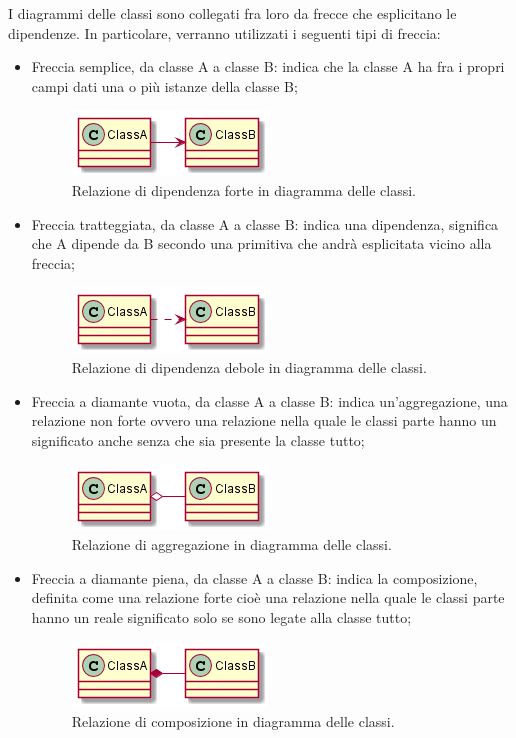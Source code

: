 \documentclass[NormeDiProgetto.tex]{subfiles}
\begin{document}
I diagrammi delle classi sono collegati fra loro da frecce che esplicitano le dipendenze.
In particolare, verranno utilizzati i seguenti tipi di freccia:
\begin{itemize}
	\item Freccia semplice, da classe A a classe B: indica che la classe A ha fra i propri campi dati una o più istanze della classe B;
	\begin{figure}[h]
		\centering
		\includegraphics[width=0.4\linewidth]{progettazione/dip}
		\caption{Relazione di dipendenza forte in diagramma delle classi.}
		\label{fig:dip}
	\end{figure}
	\newpage
	\item Freccia tratteggiata, da classe A a classe B: indica una dipendenza, significa che A dipende da B secondo una primitiva che andrà esplicitata vicino alla freccia;
	\begin{figure}[h]
		\centering
		\includegraphics[width=0.4\linewidth]{progettazione/dipdebole}
		\caption{Relazione di dipendenza debole in diagramma delle classi.}
		\label{fig:dipdebole}
	\end{figure}
	
	\item Freccia a diamante vuota, da classe A a classe B: indica un'aggregazione, una relazione non forte ovvero una relazione nella quale le classi parte hanno un significato anche senza che sia presente la classe tutto;
	\begin{figure}[h]
		\centering
		\includegraphics[width=0.4\linewidth]{progettazione/aggreg}
		\caption{Relazione di aggregazione in diagramma delle classi.}
		\label{fig:aggreg}
	\end{figure}
	
	\item Freccia a diamante piena, da classe A a classe B: indica la composizione, definita come una relazione forte cioè una relazione nella quale le classi parte hanno un reale significato solo se sono legate alla classe tutto;
	\begin{figure}[h]
		\centering
		\includegraphics[width=0.4\linewidth]{progettazione/compos}
		\caption{Relazione di composizione in diagramma delle classi.}
		\label{fig:compos}
	\end{figure}
	

\end{itemize}
\end{document}
